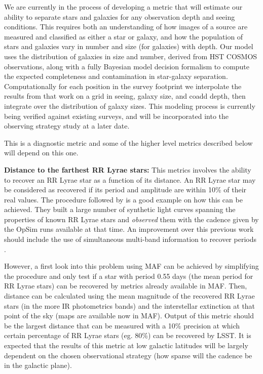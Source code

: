 We are currently in the process of developing a metric that will estimate our
ability to separate stars and galaxies for any observation depth and seeing
conditions. This requires both an understanding of how images of a source are
measured and classified as either a star or galaxy, and how the population of
stars and galaxies vary in number and size (for galaxies) with depth. Our model
uses the distribution of galaxies in size and number, derived from HST COSMOS
observations, along with a fully Bayesian model decision formalism to compute
the expected completeness and contamination in star-galaxy separation.
Computationally for each position in the survey footprint we interpolate the
results from that work on a grid in seeing, galaxy size, and coadd depth, then
integrate over the distribution of galaxy sizes. This modeling process is
currently being verified against existing surveys, and will be incorporated into
the observing strategy study at a later date.

This is a diagnostic metric and some of the higher level metrics described below 
will depend on this one.

\textbf{Distance to the farthest RR Lyrae stars:} This metrics involves the ability to
recover an RR Lyrae star as a function of its distance. An RR Lyrae star may be
considered as recovered if its period and amplitude are within 10\% of their real values.
The procedure followed by \citet{2012AJ....144....9O} is a good example on how this can be
achieved. They built a large number of synthetic light curves spanning the properties of
known RR Lyrae stars and {\sl observed} them with the cadence given by the OpSim runs
available at that time. An improvement over this previous work should include the use
of simultaneous multi-band information to recover periods \citep[e.g.,][]{vanderplas15,vivas16}.

However, a first look into this problem using MAF can be achieved
by simplifying the procedure and only test if a star with period 0.55 days (the mean period for
RR Lyrae stars) can be recovered by metrics already available in MAF.
Then, distance can be calculated using the mean magnitude of the recovered RR Lyrae stars 
(in the more IR photometrics bands) and the interstellar extinction at that point of the sky (maps are available 
now in MAF).  Output of this metric should be the largest distance that can be measured with a 10\% precision
at which certain percentage of RR 
Lyrae stars (eg. 80\%) can be recovered by LSST. It is expected that the results 
of this metric at low galactic latitudes will be largely dependent on the chosen observational 
strategy (how sparse will the cadence be  in the galactic plane).

